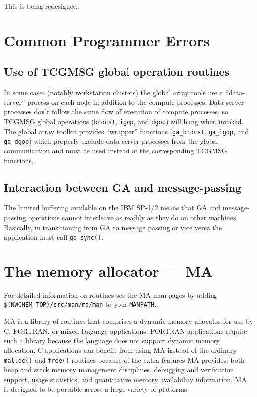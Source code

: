 This is being redesigned.

\section{Common Programmer Errors}

\subsection{Use of TCGMSG global operation routines}

In some cases (notably workstation clusters) the global array tools
use a ``data-server'' process on each node in addition to the compute
processes.  Data-server processes don't follow the same flow of
execution of compute processes, so TCGMSG global operations
(\verb+brdcst+, \verb+igop+, and \verb+dgop+) will hang when invoked.
The global array toolkit provides ``wrapper'' functions
(\verb+ga_brdcst+, \verb+ga_igop+, and \verb+ga_dgop+) which properly
exclude data server processes from the global communication and must
be used instead of the corresponding TCGMSG functions.

\subsection{Interaction between GA and message-passing}

The limited buffering available on the IBM SP-1/2 means that GA and
message-passing operations cannot interleave as readily as they do on
other machines.  Basically, in transitioning from GA to message
passing or vice versa the application must call {\tt ga\_sync()}.

\section{The memory allocator --- MA}

\sloppy
For detailed information on routines see the MA man pages by adding
{\tt \$(NWCHEM\_TOP)/src/man/ma/man} %
to your {\tt MANPATH}.

\fussy

MA is a library of routines that comprises a dynamic memory allocator
for use by C, FORTRAN, or mixed-language applications.  FORTRAN
applications require such a library because the language does not
support dynamic memory allocation.  C applications can benefit from
using MA instead of the ordinary {\tt malloc()} and {\tt free()}
routines because of the extra features MA provides: both heap and
stack memory management disciplines, debugging and verification
support, usage statistics, and quantitative memory availability
information.  MA is designed to be portable across a large variety of
platforms.

